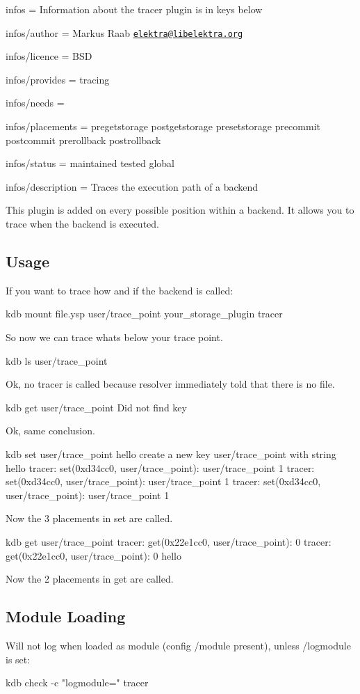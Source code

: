 
\begin{DoxyItemize}
\item infos = Information about the tracer plugin is in keys below
\item infos/author = Markus Raab \href{mailto:elektra@libelektra.org}{\tt elektra@libelektra.\+org}
\item infos/licence = B\+S\+D
\item infos/provides = tracing
\item infos/needs =
\item infos/placements = pregetstorage postgetstorage presetstorage precommit postcommit prerollback postrollback
\item infos/status = maintained tested global
\item infos/description = Traces the execution path of a backend
\end{DoxyItemize}

This plugin is added on every possible position within a backend. It allows you to trace when the backend is executed.

\subsection*{Usage}

If you want to trace how and if the backend is called\+: \begin{DoxyVerb}kdb mount file.ysp user/trace_point your_storage_plugin tracer
\end{DoxyVerb}


So now we can trace whats below your trace point. \begin{DoxyVerb}kdb ls user/trace_point
\end{DoxyVerb}


Ok, no tracer is called because resolver immediately told that there is no file. \begin{DoxyVerb}kdb get user/trace_point
Did not find key
\end{DoxyVerb}


Ok, same conclusion. \begin{DoxyVerb}kdb set user/trace_point hello
create a new key user/trace_point with string hello
tracer: set(0xd34cc0, user/trace_point): user/trace_point 1
tracer: set(0xd34cc0, user/trace_point): user/trace_point 1
tracer: set(0xd34cc0, user/trace_point): user/trace_point 1
\end{DoxyVerb}


Now the 3 placements in set are called. \begin{DoxyVerb}kdb get user/trace_point
tracer: get(0x22e1cc0, user/trace_point): 0
tracer: get(0x22e1cc0, user/trace_point): 0
hello
\end{DoxyVerb}


Now the 2 placements in get are called.

\subsection*{Module Loading}

Will not log when loaded as module (config {\ttfamily /module} present), unless {\ttfamily /logmodule} is set\+: \begin{DoxyVerb}kdb check -c "logmodule=" tracer\end{DoxyVerb}
 